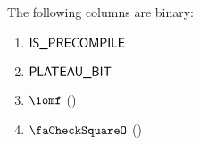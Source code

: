 The following columns are binary:
\begin{multicols}{2}
\begin{enumerate}
	\item $\textsf{IS\_PRECOMPILE}$
	\item $\textsf{PLATEAU\_BIT}$
	\item $\iomf$ \quad (\trash)
	\item $\done$ \quad (\trash)
\end{enumerate}
\end{multicols}

